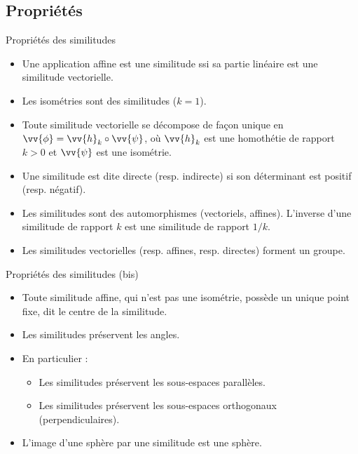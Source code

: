 \documentclass{m53beamer}
\begin{document}
\subsection{Propriétés}
\begin{frame}{Propriétés des similitudes}
  \begin{itemize}[<+(1)->]
    \item Une application affine est une similitude ssi sa partie linéaire est une similitude vectorielle.
    \item Les isométries sont des similitudes ($k=1$).
    \item Toute similitude vectorielle se décompose de façon unique en $\vv{\phi} = \vv{h}_{k}\circ \vv{\psi}$, où $\vv{h}_{k}$ est une homothétie de rapport $k > 0$ et $\vv{\psi}$ est une isométrie.
    \item Une similitude est dite \alert{directe} (resp. \alert{indirecte}) si son déterminant est positif (resp. négatif).
    \item Les similitudes sont des automorphismes (vectoriels, affines). L'inverse d'une similitude de rapport $k$ est une similitude de rapport $1/k$.
    \item Les similitudes vectorielles (resp. affines, resp. directes) forment un groupe.
  \end{itemize}
\end{frame}
\begin{frame}{Propriétés des similitudes (bis)}
  \begin{itemize}[<+(1)->]
    \item Toute similitude affine, qui n'est pas une isométrie, possède un unique point fixe, dit \alert{le centre de la similitude}.
    \item Les similitudes préservent les angles.
    \item En particulier :
    \begin{itemize}[<+(1)->]
      \item Les similitudes préservent les sous-espaces parallèles.
      \item Les similitudes préservent les sous-espaces orthogonaux (perpendiculaires).
    \end{itemize}
    \item L'image d'une sphère par une similitude est une sphère.
  \end{itemize}
\end{frame}
\end{document}
